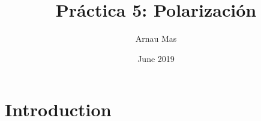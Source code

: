 \documentclass{article}
\title{Práctica 5: Polarización}
\author{Arnau Mas}
\date{June 2019}
\begin{document}
\maketitle

\section{Introduction}
\end{document}
